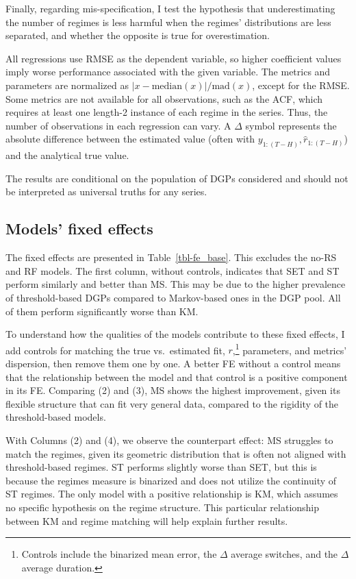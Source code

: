 \documentclass[
  letterpaper,
  DIV=11,
  numbers=noendperiod]{scrartcl}
\numberwithin{equation}{section}
\numberwithin{table}{section}
\numberwithin{figure}{section}
\begin{document}
Finally, regarding mis-specification, I test the hypothesis that
underestimating the number of regimes is less harmful when the regimes'
distributions are less separated, and whether the opposite is true for
overestimation.

All regressions use RMSE as the dependent variable, so higher
coefficient values imply worse performance associated with the given
variable. The metrics and parameters are normalized as
\(|x - \text{median}(x)| / \text{mad}(x)\), except for the RMSE. Some
metrics are not available for all observations, such as the ACF, which
requires at least one length-2 instance of each regime in the series.
Thus, the number of observations in each regression can vary. A
\(\Delta\) symbol represents the absolute difference between the
estimated value (often with \(y_{1:(T - H)}, \hat{r}_{1:(T - H)}\)) and
the analytical true value.

The results are conditional on the population of DGPs considered and
should not be interpreted as universal truths for any series.

\subsection{Models' fixed effects}\label{sec-perf-fe}

The fixed effects are presented in Table~\ref{tbl-fe_base}. This
excludes the no-RS and RF models. The first column, without controls,
indicates that SET and ST perform similarly and better than MS. This may
be due to the higher prevalence of threshold-based DGPs compared to
Markov-based ones in the DGP pool. All of them perform significantly
worse than KM.

To understand how the qualities of the models contribute to these fixed
effects, I add controls for matching the true vs.~estimated fit,
\(r\),\footnote{Controls include the binarized mean error, the
  \(\Delta\) average switches, and the \(\Delta\) average duration.}
parameters, and metrics' dispersion, then remove them one by one. A
better FE without a control means that the relationship between the
model and that control is a positive component in its FE. Comparing (2)
and (3), MS shows the highest improvement, given its flexible structure
that can fit very general data, compared to the rigidity of the
threshold-based models.

With Columns (2) and (4), we observe the counterpart effect: MS
struggles to match the regimes, given its geometric distribution that is
often not aligned with threshold-based regimes. ST performs slightly
worse than SET, but this is because the regimes measure is binarized and
does not utilize the continuity of ST regimes. The only model with a
positive relationship is KM, which assumes no specific hypothesis on the
regime structure. This particular relationship between KM and regime
matching will help explain further results.
\end{document}
